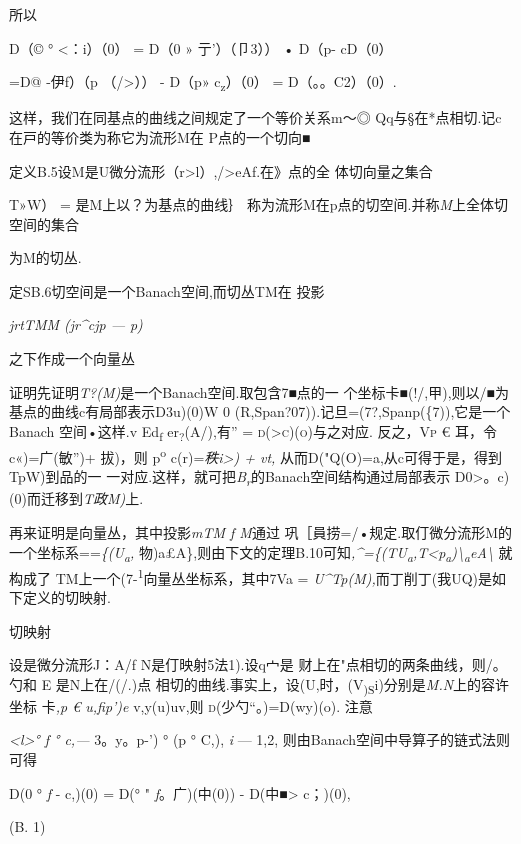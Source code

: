 所以

D（© ° \textless{}：i）（0） = D（0 » 亍'）（卩3）） • D（p- cD（0）

=D@ -伊f）（p （/\textgreater{}）） - D（p» c\textsubscript{z}）（0） =
D（。。C2）（0）.

这样，我们在同基点的曲线之间规定了一个等价关系m〜◎
Qq与§在*点相切.记c在戸的等价类为称它为流形M在 P点的一个切向■

定义B.5设M是U微分流形（r\textgreater{}l）,/\textgreater{}eAf.在》点的全
体切向量之集合

T»W） = 是M上以？为基点的曲线｝
称为流形M在p点的切空间.并称\emph{M}上全体切空间的集合

为M的切丛.

定SB.6切空间是一个Banach空间,而切丛TM在 投影

\emph{jrtTMM (jr\^{}cjp --- p)}

之下作成一个向量丛

证明先证明\emph{T?(M)}是一个Banach空间.取包含7■点的一
个坐标卡■(!/,甲),则以/■为基点的曲线c有局部表示D3u)(0)W 0
(R,Span?07)).记旦=(7?,Spanp(\{7)),它是一个 Banach 空间•这样.v
Ed\textsubscript{f} er\textsubscript{?}(A/),有'' \textsc{=
d(\textgreater{}c)(o)}与之对应. 反之，\textsc{Vp} € 耳，令 c«)=广(敏'')+
拔)，则 p\textsuperscript{o} c(r)=\emph{秩i\textgreater{}) + vt,}
从而D("Q(O)=a,从c可得于是，得到TpW)到品的一
一对应.这样，就可把\emph{B\textsubscript{r}}的Banach空间结构通过局部表示
D0\textgreater{}。c)(0)而迁移到\emph{T政M)}上.

再来证明是向量丛，其中投影\emph{mTM f M}通过
巩［員捞=/•规定.取仃微分流形M的一个坐标系==\emph{\{(U\textsubscript{a},}
物)\textbar{}a£A\},则由下文的定理B.10可知\emph{,\^{}=\{(TU\textsubscript{a},T\textless{}p\textsubscript{a})\textbackslash{}\textsubscript{a}eA\textbackslash{}}
就构成了 TM上一个(7-\textsuperscript{1}向量丛坐标系，其中7Va =
\emph{U\^{}Tp(M),}而丁削丁(我UQ)是如下定义的切映射.

切映射

设是微分流形J：A/f N是仃映射5法1).设q宀是
财上在"点相切的两条曲线，则/。勺和 E 是N上在/(/.)点
相切的曲线.事实上，设(U,时，(V\textsubscript{)S}i)分别是\emph{M.N}上的容许坐标
卡\emph{,p € u,fip')e} v,y(u)uv,则 \textsc{d}(少勺``。)=D(wy)(o). 注意

\emph{\textless{}l\textgreater{}° f ° c,---} 3。y。p-') ° (p ° C,),
\emph{i} --- 1,2, 则由Banach空间中导算子的链式法则可得

D(0 ° \emph{f} - c,)(0) = D(° " \emph{f}。广)(中(0)) -
D(中■\textgreater{} c；)(0),

(B. 1)

